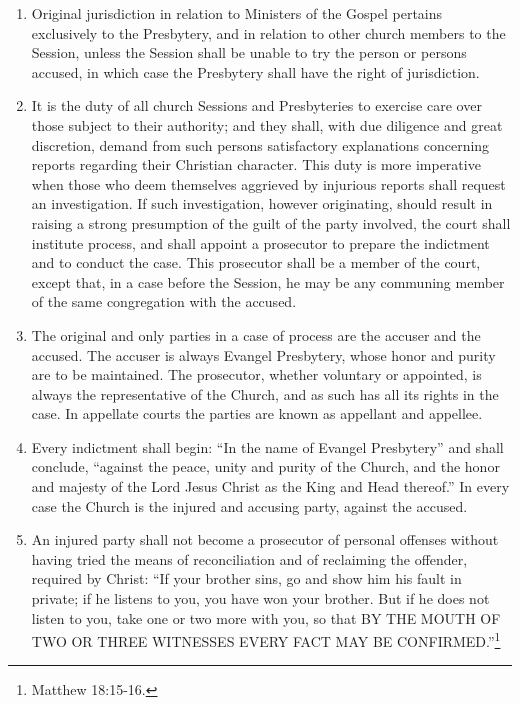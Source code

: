 \documentclass[
]{book}
\providecommand{\tightlist}{%
  \setlength{\itemsep}{0pt}\setlength{\parskip}{0pt}}
\begin{document}
\protect\hypertarget{chapter-slug-35-the-parties-in-cases-of-process}{\href{}{}}

\begin{enumerate}
\def\labelenumi{\arabic{enumi}.}
\tightlist
\item
  \protect\hypertarget{35}{\href{}{}}Original jurisdiction in relation to Ministers of the Gospel pertains exclusively to the Presbytery, and in relation to other church members to the Session, unless the Session shall be unable to try the person or persons accused, in which case the Presbytery shall have the right of jurisdiction.
\item
  \protect\hypertarget{35.2}{\href{}{}}It is the duty of all church Sessions and Presbyteries to exercise care over those subject to their authority; and they shall, with due diligence and great discretion, demand from such persons satisfactory explanations concerning reports regarding their Christian character. This duty is more imperative when those who deem themselves aggrieved by injurious reports shall request an investigation. If such investigation, however originating, should result in raising a strong presumption of the guilt of the party involved, the court shall institute process, and shall appoint a prosecutor to prepare the indictment and to conduct the case. This prosecutor shall be a member of the court, except that, in a case before the Session, he may be any communing member of the same congregation with the accused.
\item
  The original and only parties in a case of process are the accuser and the accused. The accuser is always Evangel Presbytery, whose honor and purity are to be maintained. The prosecutor, whether voluntary or appointed, is always the representative of the Church, and as such has all its rights in the case. In appellate courts the parties are known as appellant and appellee.
\item
  Every indictment shall begin: ``In the name of Evangel Presbytery'' and shall conclude, ``against the peace, unity and purity of the Church, and the honor and majesty of the Lord Jesus Christ as the King and Head thereof.'' In every case the Church is the injured and accusing party, against the accused.
\item
  An injured party shall not become a prosecutor of personal offenses without having tried the means of reconciliation and of reclaiming the offender, required by Christ: ``If your brother sins, go and show him his fault in private; if he listens to you, you have won your brother. But if he does not listen to you, take one or two more with you, so that BY THE MOUTH OF TWO OR THREE WITNESSES EVERY FACT MAY BE CONFIRMED.''\footnote{Matthew 18:15-16.}
\end{enumerate}
\end{document}
